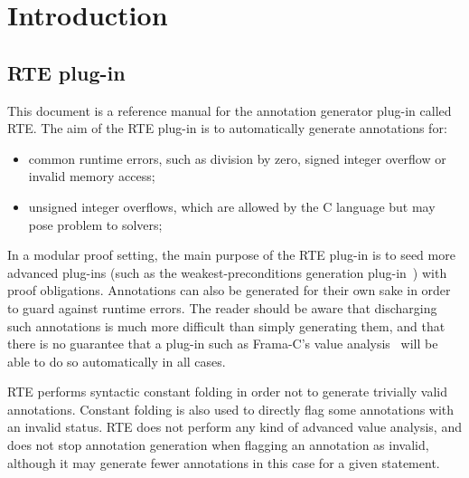 \newcommand{\bropen}{\mbox{\tt [}}
\newcommand{\brclose}{\mbox{\tt ]}}
\newcommand{\cbopen}{\mbox{\tt \{}}
\newcommand{\cbclose}{\mbox{\tt \}}}
\newcommand{\cnn}{\mbox{ISO C23}}
\newcommand{\iso}[2]{\cnn{}~\mbox{#1\if#2\empty\else~§~#2\fi}}
\newcommand{\optsigned}{\mbox{\lstinline|-rte-signed|}}
\newcommand{\optnodowncast}{\mbox{\lstinline|-rte-no-downcast|}}
\newcommand{\rte}{\textsf{RTE}\xspace}
\newcommand{\framac}{\textsf{Frama-C}\xspace}
\newcommand{\acsl}{\textsf{ACSL}\xspace}
\newcommand{\gcc}{\textsf{Gcc}\xspace}
\newcommand{\clang}{\textsf{Clang}\xspace}

\tableofcontents

\chapter{Introduction}\label{introduction}
\vspace{1cm}

\section{\rte{} plug-in}

This document is a reference manual for the annotation generator plug-in called
\rte{}.  The aim of the \rte{} plug-in is to automatically generate annotations
for:

\begin{itemize}
\item common runtime errors, such as division by zero, signed integer overflow
  or invalid memory access;
\item unsigned integer overflows, which are allowed by the C language but may
  pose problem to solvers;
\end{itemize}

In a modular proof setting, the main purpose of the \rte{} plug-in is to seed
more advanced plug-ins (such as the weakest-preconditions generation
plug-in~\cite{framacwp}) with proof obligations.  Annotations can also be
generated for their own sake in order to guard against runtime errors.  The
reader should be aware that discharging such annotations is much more difficult
than simply generating them, and that there is no guarantee that a plug-in such
as \framac{}'s value analysis~\cite{framacvalueanalysis} will be able to do so
automatically in all cases.

\rte{} performs syntactic constant folding in order not to generate trivially
valid annotations.  Constant folding is also used to directly flag some
annotations with an invalid status.  \rte{} does not perform any kind of
advanced value analysis, and does not stop annotation generation when flagging
an annotation as invalid, although it may generate fewer annotations in this
case for a given statement.

